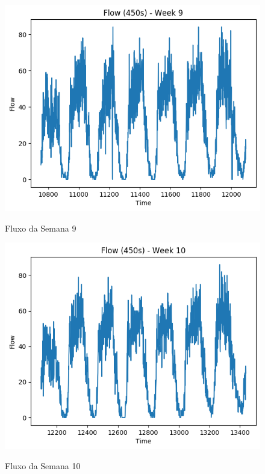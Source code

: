 \begin{figure}[h]
    \centering
    \includegraphics[scale=0.9]{monography/img/flows/flow_450_week_09.png}
    \label{figure:flow_450_week_09}
    \caption{Fluxo da Semana 9}
\end{figure}

\begin{figure}[h]
    \centering
    \includegraphics[scale=0.9]{monography/img/flows/flow_450_week_10.png}
    \label{figure:flow_450_week_10}
    \caption{Fluxo da Semana 10}
\end{figure}

